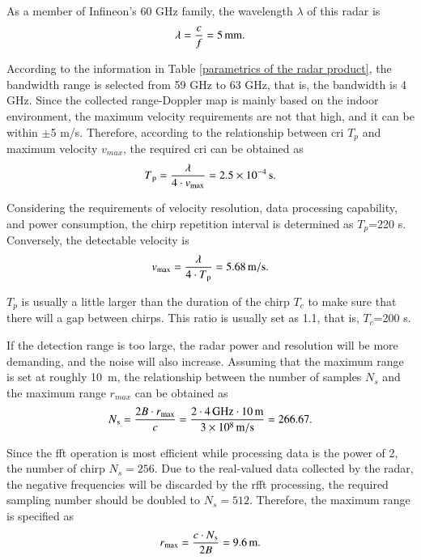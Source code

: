 As a member of Infineon's 60 GHz family, the wavelength $\lambda$ of this radar is
\begin{equation}
    \centering
    \lambda = \frac{c}{f} = 5\,\mathrm{mm}.
\end{equation}

According to the information in Table \ref{parametrics of the radar product}, the bandwidth range is selected from 59 GHz to 63 GHz, that is, the bandwidth is 4 GHz. Since the collected range-Doppler map is mainly based on the indoor environment, the maximum velocity requirements are not that high, and it can be within $\pm$5 m/s. Therefore, according to the relationship between \gls{cri} $T_p$ and maximum velocity $v_{max}$, the required \gls{cri} can be obtained as
\begin{equation}
    \centering
    T\textsubscript{p} = \frac{\lambda}{4 \cdot v\textsubscript{max}} = 2.5 \times 10^{-4}\,\mathrm{s}.
\end{equation}

Considering the requirements of velocity resolution, data processing capability, and power consumption, the chirp repetition interval is determined as $T_p$=220 \textmu s. Conversely, the detectable velocity is
\begin{equation}
    \centering
    v\textsubscript{max} = \frac{\lambda}{4 \cdot T\textsubscript{p}} = 5.68\,\mathrm{m/s}.
    \label{maximum velocity equation}
\end{equation}

$T_p$ is usually a little larger than the duration of the chirp $T_c$ to make sure that there will a gap between chirps. This ratio is usually set as 1.1, that is, $T_c$=200 \textmu s.

If the detection range is too large, the radar power and resolution will be more demanding, and the noise will also increase. Assuming that the maximum range is set at roughly \SI{10}{\meter}, the relationship between the number of samples $N_s$ and the maximum range $r_{max}$ can be obtained as
\begin{equation}
    \centering
    N\textsubscript{s} = \frac{2B \cdot r\textsubscript{max}}{c} = \frac{2 \cdot 4\,\mathrm{GHz} \cdot 10\,\mathrm{m}}{3 \times 10\textsuperscript{8}\,\mathrm{m/s}} = 266.67.
\end{equation}

Since the \gls{fft} operation is most efficient while processing data is the power of 2, the number of chirp $N_s=256$. Due to the real-valued data collected by the radar, the negative frequencies will be discarded by the \gls{rfft} processing, the required sampling number should be doubled to $N_s=512$. Therefore, the maximum range is specified as 
\begin{equation}
    \centering
    r\textsubscript{max} = \frac{c \cdot N\textsubscript{s}}{2B} = 9.6\,\mathrm{m}.
    \label{maximum range equation}
\end{equation}

